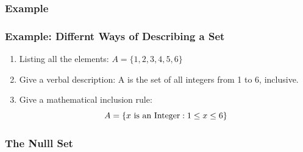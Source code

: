 \documentclass[compress]{beamer}
\begin{document}
\begin{frame}\frametitle{Example}

\end{frame}



\begin{frame}\frametitle{Example: Differnt Ways of Describing a Set}
\begin{enumerate}
\item Listing all the elements:  $A=\{1, 2, 3,4, 5, 6\}$
\pause
\item Give a verbal description: A is the set of all integers from 1 to 6, inclusive.
\pause
\item Give a mathematical inclusion rule: $$A=\{x \text{ is an  Integer} : 1\leq x\leq 6\}$$
\end{enumerate}
\vspace{1.5in}

\end{frame}




\begin{frame}
	\frametitle{The Nulll Set}
	 
 
	 \\
	 \vspace{.1in}

		
 
	
\end{frame}
\end{document}

